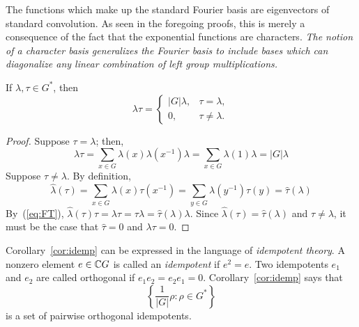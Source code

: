 The functions which make up the standard Fourier basis
are eigenvectors of standard convolution.  
As seen in the foregoing proofs, %
this is merely a consequence of the fact that the
exponential functions are %
characters.  \emph{The notion of a character basis
generalizes the Fourier basis to include bases which
can diagonalize any linear combination of 
left group multiplications.}
\begin{corollary}\label{cor:idemp}
If $\lambda, \tau \in G^*$, then
\begin{equation}
\lambda \tau = 
\begin{cases}  |G|\lambda, & \tau=\lambda,\\
0, & \tau\neq\lambda.
\end{cases}
\end{equation}
\end{corollary}
\begin{proof}
Suppose $\tau = \lambda$; then,
\[\lambda \tau %
= \sum_{x\in G} \lambda(x)\lambda(x^{-1})\lambda
= \sum_{x\in G} \lambda(1)\lambda = |G|\lambda
\]%
Suppose $\tau \neq \lambda$. By definition,
\begin{equation}
\hat{\lambda}(\tau) = \sum_{x\in G}\lambda(x)\tau(x^{-1}) =
\sum_{y\in G}\lambda(y^{-1})\tau(y) = \hat{\tau}(\lambda)
\end{equation}
By~(\ref{eq:FT}), 
$\hat{\lambda}(\tau)\tau = \lambda\tau = \tau\lambda =\hat{\tau}(\lambda)\lambda $.  
Since $\hat{\lambda}(\tau) = \hat{\tau}(\lambda)$ and $\tau
\neq \lambda$, it must be the case that
$\hat{\tau} = 0$ and $\lambda\tau = 0$.
\end{proof}
Corollary~\ref{cor:idemp} can be expressed in the language
of \emph{idempotent theory}.  A nonzero element $e \in \mathbb{C} G$
is called an \emph{idempotent} if $e^2 = e$. Two idempotents
$e_1$ and $e_2$ are called orthogonal if
$e_1e_2 = e_2e_1 = 0$.
Corollary~\ref{cor:idemp} says that 
\[
\left\{\frac{1}{|G|}\rho : \rho \in G^* \right\}
\]
is a set of pairwise orthogonal idempotents.

